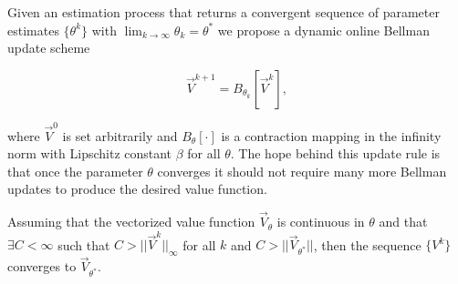 \documentclass[letterpaper, 10 pt, conference]{ieeeconf}
\begin{document}
Given an estimation process that returns a convergent sequence of parameter estimates $\{\theta^k\}$  with $\lim_{k \rightarrow \infty} \theta_k = \theta^*$ we propose a dynamic online Bellman update scheme 

\begin{equation} \label{eq:dyn_bell}
\vec{V}^{k+1}=B_{\theta_k}[\vec{V}^k],
\end{equation}

\noindent where $\vec{V}^{0}$ is set arbitrarily and $B_\theta[\cdot]$ is a contraction mapping in the infinity norm with Lipschitz constant $\beta$ for all $\theta$. The hope behind this update rule is that  once the parameter $\theta$ converges it should not require many more Bellman updates to produce the desired value function. 

\begin{proposition} 
Assuming that the vectorized value function $\vec{V}_\theta$ is continuous in $\theta$ and that $\exists C<\infty$ such that $C>||\vec{V}^k||_{\infty}$ for all $k$ and $C>||\vec{V}_{\theta^*}||$, then the sequence $\{V^k\}$ converges to $\vec{V}_{\theta^*}$.
\end{proposition}
\end{document}
